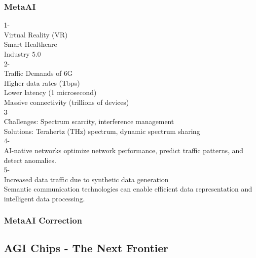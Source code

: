 \subsubsection{MetaAI}
\begin{tcolorbox}[breakable]
1-\\
Virtual Reality (VR)\\
Smart Healthcare\\
Industry 5.0\\

2-\\
Traffic Demands of 6G\\
Higher data rates (Tbps)\\
Lower latency (1 microsecond)\\
Massive connectivity (trillions of devices)\\

3-\\
Challenges: Spectrum scarcity, interference management\\
Solutions: Terahertz (THz) spectrum, dynamic spectrum sharing\\

4-\\
AI-native networks optimize network performance, predict traffic patterns, and detect anomalies.\\

5-\\
Increased data traffic due to synthetic data generation\\
Semantic communication technologies can enable efficient data representation and intelligent data processing.\\
\end{tcolorbox}
\subsubsection{MetaAI Correction}
\begin{tcolorbox}[breakable]
    
\end{tcolorbox}

\subsection{AGI Chips - The Next Frontier}
